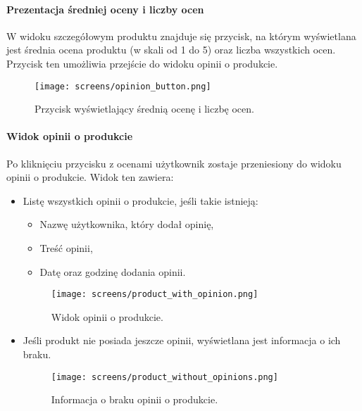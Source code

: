 \documentclass[12pt,a4paper,oneside]{article}
\theoremstyle{definition}
\numberwithin{equation}{section}
\begin{document}
\paragraph{Prezentacja średniej oceny i liczby ocen}
W widoku szczegółowym produktu znajduje się przycisk, na którym wyświetlana jest średnia ocena produktu (w skali od 1 do 5) oraz liczba wszystkich ocen. Przycisk ten umożliwia przejście do widoku opinii o produkcie.

\begin{figure}[H]
    \centering
    \texttt{[image: screens/opinion\_button.png]}
    \caption{Przycisk wyświetlający średnią ocenę i liczbę ocen.}
    \label{fig:rating_button}
\end{figure}

\paragraph{Widok opinii o produkcie}
Po kliknięciu przycisku z ocenami użytkownik zostaje przeniesiony do widoku opinii o produkcie. Widok ten zawiera:
\begin{itemize}
    \item Listę wszystkich opinii o produkcie, jeśli takie istnieją:
    \begin{itemize}
        \item Nazwę użytkownika, który dodał opinię,
        \item Treść opinii,
        \item Datę oraz godzinę dodania opinii.
    \end{itemize}
    \begin{figure}[H]
        \centering
        \texttt{[image: screens/product\_with\_opinion.png]}
        \caption{Widok opinii o produkcie.}
        \label{fig:review_list}
    \end{figure}
    \item Jeśli produkt nie posiada jeszcze opinii, wyświetlana jest informacja o ich braku.
    \begin{figure}[H]
        \centering
        \texttt{[image: screens/product\_without\_opinions.png]}
        \caption{Informacja o braku opinii o produkcie.}
        \label{fig:no_reviews}
    \end{figure}
    
\end{itemize}
\end{document}
